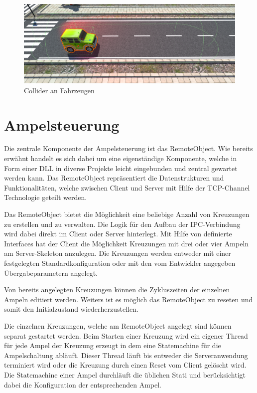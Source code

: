 \begin{figure}[H]
\begin{center}
	\includegraphics[width=1\textwidth]{BilderAllgemein/Jeep_Collider.png}
\end{center}
	\caption{Collider an Fahrzeugen}
	\label{img:car_collider}
\end{figure}

\section{Ampelsteuerung}

Die zentrale Komponente der Ampelsteuerung ist das RemoteObject. Wie bereits erwähnt handelt es sich dabei um eine eigenständige Komponente, welche in Form einer DLL in diverse Projekte leicht eingebunden und zentral gewartet werden kann. Das RemoteObject repräsentiert die Datenstrukturen und Funktionalitäten, welche zwischen Client und Server mit Hilfe der TCP-Channel Technologie geteilt werden.

Das RemoteObject bietet die Möglichkeit eine beliebige Anzahl von Kreuzungen zu erstellen und zu verwalten. Die Logik für den Aufbau der IPC-Verbindung wird dabei direkt im Client oder Server hinterlegt. Mit Hilfe von definierte Interfaces hat der Client die Möglichkeit Kreuzungen mit drei oder vier Ampeln am Server-Skeleton anzulegen. Die Kreuzungen werden entweder mit einer festgelegten Standardkonfiguration oder mit den vom Entwickler angegeben Übergabeparametern angelegt.

Von bereits angelegten Kreuzungen können die Zykluszeiten der einzelnen Ampeln editiert werden. Weiters ist es möglich das RemoteObject zu reseten und somit den Initialzustand wiederherzustellen.

Die einzelnen Kreuzungen, welche am RemoteObject angelegt sind können separat gestartet werden. Beim Starten einer Kreuzung wird ein eigener Thread für jede Ampel der Kreuzung erzeugt in dem eine Statemachine für die Ampelschaltung abläuft. Dieser Thread läuft bis entweder die Serveranwendung terminiert wird oder die Kreuzung durch einen Reset vom Client gelöscht wird. Die Statemachine einer Ampel durchläuft die üblichen Stati und berücksichtigt dabei die Konfiguration der entsprechenden Ampel. 

